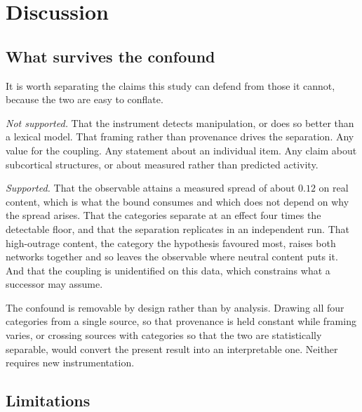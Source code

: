 \documentclass[preprint,12pt]{elsarticle}
\begin{document}
\section{Discussion}
\label{sec:discussion}

\subsection{What survives the confound}
\label{sec:whatsurvives}

It is worth separating the claims this study can defend from those it cannot, because the two
are easy to conflate.

\emph{Not supported.} That the instrument detects manipulation, or does so better than a
lexical model. That framing rather than provenance drives the separation. Any value for the
coupling. Any statement about an individual item. Any claim about subcortical structures, or
about measured rather than predicted activity.

\emph{Supported.} That the observable attains a measured spread of about $0.12$ on real
content, which is what the bound consumes and which does not depend on why the spread arises.
That the categories separate at an effect four times the detectable floor, and that the
separation replicates in an independent run. That high-outrage content, the category the
hypothesis favoured most, raises both networks together and so leaves the observable where
neutral content puts it. And that the coupling is unidentified on this data, which constrains
what a successor may assume.

The confound is removable by design rather than by analysis. Drawing all four categories from
a single source, so that provenance is held constant while framing varies, or crossing
sources with categories so that the two are statistically separable, would convert the
present result into an interpretable one. Neither requires new instrumentation.

\subsection{Limitations}
\label{sec:limitations}
\end{document}
